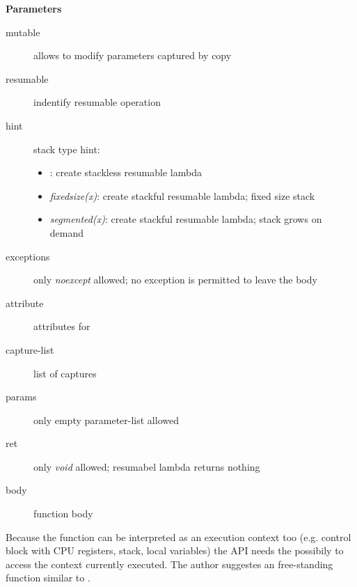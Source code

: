 {\bf Parameters}
\begin{description}
    \item[mutable]      allows to modify parameters captured by copy
    \item[resumable]    indentify resumable operation
    \item[hint]         stack type hint:
                        \begin{itemize}
                            \item <no hint specified>: create stackless resumable lambda
                            \item \textit{fixedsize(x)}: create stackful resumable lambda; fixed size stack
                            \item \textit{segmented(x)}: create stackful resumable lambda; stack grows on demand
                        \end{itemize}
    \item[exceptions]   only \textit{noexcept} allowed; no exception is permitted to leave the body
    \item[attribute]    attributes for 
    \item[capture-list] list of captures
    \item[params]       only empty parameter-list allowed
    \item[ret]          only \textit{void} allowed; resumabel lambda returns nothing
    \item[body]         function body\\
\end{description}

Because the function \main can be interpreted as an execution context too
(e.g. control block with CPU registers, stack, local variables) the API needs
the possibily to access the context currently executed. The author suggestes an
free-standing function similar to \ectxcurrent.
